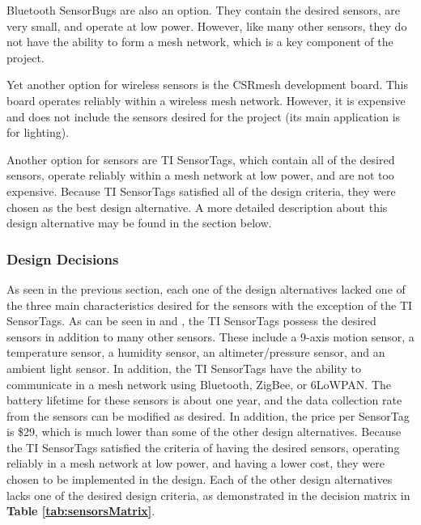 \documentclass[PPFS.tex]{template/subfiles}
\begin{document}
Bluetooth SensorBugs are also an option. They contain the desired sensors, are very small, and operate at low power. However, like many other sensors, they do not have the ability to form a mesh network, which is a key component of the project. \cite{Bluetooth}

Yet another option for wireless sensors is the CSRmesh development board. This board operates reliably within a wireless mesh network. However, it is expensive and does not include the sensors desired for the project (its main application is for lighting). \cite{CSRmesh}

Another option for sensors are TI SensorTags, which contain all of the desired sensors, operate reliably within a mesh network at low power, and are not too expensive. Because TI SensorTags satisfied all of the design criteria, they were chosen as the best design alternative. A more detailed description about this design alternative may be found in the section below. \cite{SensorTag}

\subsubsection{Design Decisions}

As seen in the previous section, each one of the design alternatives lacked one of the three main characteristics desired for the sensors with the exception of the TI SensorTags. As can be seen in  and , the TI SensorTags possess the desired sensors in addition to many other sensors. These include a 9-axis motion sensor, a temperature sensor, a humidity sensor, an altimeter/pressure sensor, and an ambient light sensor. In addition, the TI SensorTags have the ability to communicate in a mesh network using Bluetooth, ZigBee, or 6LoWPAN. The battery lifetime for these sensors is about one year, and the data collection rate from the sensors can be modified as desired. In addition, the price per SensorTag is \$29, which is much lower than some of the other design alternatives. Because the TI SensorTags satisfied the criteria of having the desired sensors, operating reliably in a mesh network at low power, and having a lower cost, they were chosen to be implemented in the design. Each of the other design alternatives lacks one of the desired design criteria, as demonstrated in the decision matrix in \textbf{Table \ref{tab:sensorsMatrix}}. \cite{SensorTag}
\end{document}
